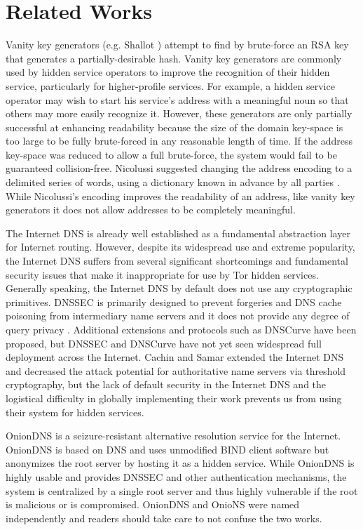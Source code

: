 \documentclass[USenglish,oneside,twocolumn]{article}
\begin{document}
\section{Related Works}
\label{sec:RelatedWorks}

Vanity key generators (e.g. Shallot \cite{KatmagicShallot}) attempt to find by brute-force an RSA key that generates a partially-desirable hash. Vanity key generators are commonly used by hidden service operators to improve the recognition of their hidden service, particularly for higher-profile services. For example, a hidden service operator may wish to start his service's address with a meaningful noun so that others may more easily recognize it. However, these generators are only partially successful at enhancing readability because the size of the domain key-space is too large to be fully brute-forced in any reasonable length of time. If the address key-space was reduced to allow a full brute-force, the system would fail to be guaranteed collision-free. Nicolussi suggested changing the address encoding to a delimited series of words, using a dictionary known in advance by all parties \cite{nicolussi2011human}. While Nicolussi's encoding improves the readability of an address, like vanity key generators it does not allow addresses to be completely meaningful.

The Internet DNS is already well established as a fundamental abstraction layer for Internet routing. However, despite its widespread use and extreme popularity, the Internet DNS suffers from several significant shortcomings and fundamental security issues that make it inappropriate for use by Tor hidden services. Generally speaking, the Internet DNS by default does not use any cryptographic primitives. DNSSEC is primarily designed to prevent forgeries and DNS cache poisoning from intermediary name servers and it does not provide any degree of query privacy \cite{wachs2014censorship}. Additional extensions and protocols such as DNSCurve \cite{bernstein2009dnscurve} have been proposed, but DNSSEC and DNSCurve have not yet seen widespread full deployment across the Internet. Cachin and Samar \cite{cachin2004secure} extended the Internet DNS and decreased the attack potential for authoritative name servers via threshold cryptography, but the lack of default security in the Internet DNS and the logistical difficulty in globally implementing their work prevents us from using their system for hidden services.

OnionDNS \cite{scaife2015oniondns} is a seizure-resistant alternative resolution service for the Internet. OnionDNS is based on DNS and uses unmodified BIND client software but anonymizes the root server by hosting it as a hidden service. While OnionDNS is highly usable and provides DNSSEC and other authentication mechanisms, the system is centralized by a single root server and thus highly vulnerable if the root is malicious or is compromised. OnionDNS and OnioNS were named independently and readers should take care to not confuse the two works.
\end{document}
